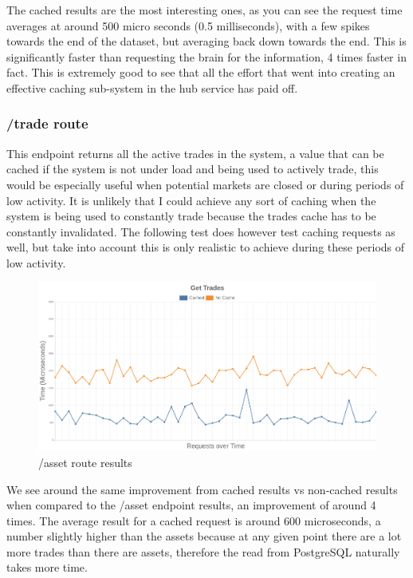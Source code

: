 \documentclass[titlepage]{article}
\begin{document}
The cached results are the most interesting ones, as you can see the request time averages at around 500 micro seconds (0.5 milliseconds), with a few spikes towards the end of the dataset, but averaging back down towards the end. This is significantly faster than requesting the brain for the information, 4 times faster in fact. This is extremely good to see that all the effort that went into creating an effective caching sub-system in the hub service has paid off.

\pagebreak
\subsubsection{/trade route}
This endpoint returns all the active trades in the system, a value that can be cached if the system is not under load and being used to actively trade, this would be especially useful when potential markets are closed or during periods of low activity. It is unlikely that I could achieve any sort of caching when the system is being used to constantly trade because the trades cache has to be constantly invalidated. The following test does however test caching requests as well, but take into account this is only realistic to achieve during these periods of low activity.

\begin{figure}[h!]
  \caption{/asset route results}
\hspace*{-3cm}
\includegraphics[width=1.5\textwidth]{../results/get-trades.png}
\end{figure}

We see around the same improvement from cached results vs non-cached results when compared to the /asset endpoint results, an improvement of around 4 times. The average result for a cached request is around 600 microseconds, a number slightly higher than the assets because at any given point there are a lot more trades than there are assets, therefore the read from PostgreSQL naturally takes more time. \\
\end{document}
